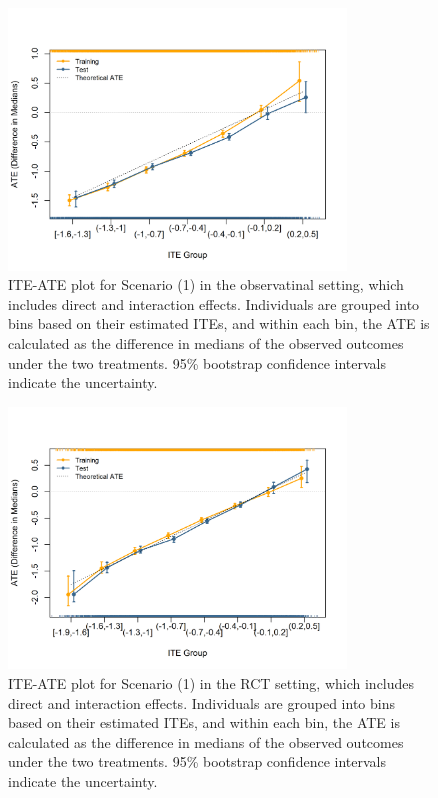 \begin{figure}[htbp]
\centering
\includegraphics[width=0.8\textwidth]{img/results/observ_scenario1_ITE_ATE.png}
\vspace{-15pt}
\caption{ITE-ATE plot for Scenario (1) in the observatinal setting, which includes direct and interaction effects. Individuals are grouped into bins based on their estimated ITEs, and within each bin, the ATE is calculated as the difference in medians of the observed outcomes under the two treatments. 95\% bootstrap confidence intervals indicate the uncertainty.}
\label{fig:observ_scenario1_ite_ATE}
\end{figure}


\begin{figure}[htbp]
\centering
\includegraphics[width=0.8\textwidth]{img/results/rct_scenario1_ITE_ATE.png}
\vspace{-15pt}
\caption{ITE-ATE plot for Scenario (1) in the RCT setting, which includes direct and interaction effects. Individuals are grouped into bins based on their estimated ITEs, and within each bin, the ATE is calculated as the difference in medians of the observed outcomes under the two treatments. 95\% bootstrap confidence intervals indicate the uncertainty.}
\label{fig:rct_scenario1_ite_ATE}
\end{figure}


